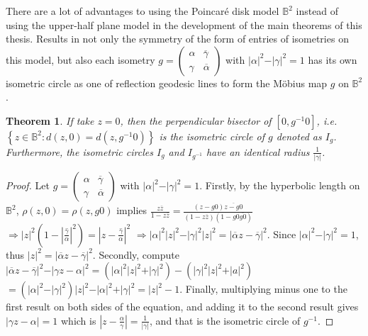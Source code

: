\documentclass[12pt,oneside]{sfsuthesis}
\theoremstyle{plain} %
\newtheorem{theorem}{Theorem}[chapter]
\theoremstyle{definition}  %
\theoremstyle{remark}  %
\theoremstyle{plain}
\begin{document}
{There are a lot of advantages to using the Poincar\'{e} disk model $\mathbb{B}^2$ instead of using the upper-half plane model in the development of the main theorems of this thesis. Results in not only the symmetry of the form of entries of isometries on this model, but also each isometry $g=\begin{pmatrix}
\alpha &  \overline{\gamma}\\
\gamma &  \overline{\alpha}
\end{pmatrix}$ with $\vert \alpha\vert^2-\vert \gamma\vert^2=1$ has its own isometric circle as one of reflection geodesic lines to form the M\"{o}bius map $g$ on $\mathbb{B}^2$.
\begin{theorem}\label{Isometric_thm}
If take $z=0$, then the perpendicular bisector of $[0,g^{-1}0]$, i.e. $\left\lbrace z\in\mathbb{B}^2 : d(z,0)=d(z,g^{-1}0)\right\rbrace$ is the isometric circle of $g$ denoted as $I_g$. Furthermore, the isometric circles $I_g$ and $I_{g^{-1}}$ have an identical radius $\frac{1}{\vert \gamma\vert}$.
\end{theorem}
\begin{proof} Let $g=\begin{pmatrix}
\alpha &  \overline{\gamma}\\
\gamma &  \overline{\alpha}
\end{pmatrix}$ with $\vert \alpha\vert^2-\vert \gamma\vert^2=1$. Firstly, by the hyperbolic length on $\mathbb{B}^2$, $\rho(z,0)=\rho(z,g0)$ implies $\frac{z\overline{z}}{1-z\overline{z}}=\frac{(z-g0)\overline{z-g0}}{(1-z\overline{z})(1-g0\overline{g0})}$ $\Rightarrow \vert z\vert^2\left( 1-\left\vert \overline{\frac{\gamma}{\alpha}}\right\vert^2\right)=\left\vert z-\overline{\frac{\gamma}{\alpha}}\right\vert^2$ $\Rightarrow \vert \alpha \vert^2\vert z\vert^2-\vert \gamma\vert^2\vert z\vert^2=\vert \overline{\alpha} z-\overline{\gamma}\vert^2$. Since $\vert \alpha\vert^2-\vert \gamma\vert^2=1$, thus $\vert z\vert^2=\vert \overline{\alpha}z-\overline{\gamma}\vert^2$. Secondly, compute $\vert \overline{\alpha}z-\overline{\gamma}\vert^2 - \vert \gamma z-\alpha\vert^2 = (\vert \alpha\vert^2\vert z\vert^2+\vert \gamma\vert^2)-(\vert \gamma\vert^2\vert z\vert^2+\vert a\vert^2)$ $=(\vert \alpha\vert^2-\vert \gamma\vert^2)\vert z\vert^2-\vert \alpha\vert^2+\vert \gamma\vert^2=\vert z\vert^2-1$. Finally, multiplying minus one to the first result on both sides of the equation, and adding it to the second result gives $\vert \gamma z-\alpha\vert=1$ which is $\left\vert z -\frac{\alpha}{\gamma}\right\vert=\frac{1}{\vert \gamma\vert}$, and that is the isometric circle of $g^{-1}$.
\end{proof}


}
\end{document}
